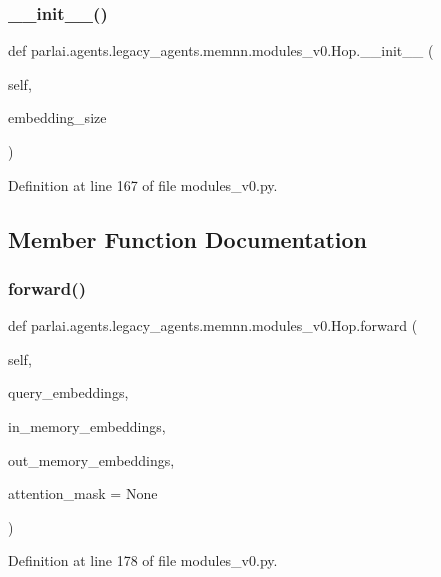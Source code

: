 \subsubsection{\texorpdfstring{\+\_\+\+\_\+init\+\_\+\+\_\+()}{\_\_init\_\_()}}
{\footnotesize\ttfamily def parlai.\+agents.\+legacy\+\_\+agents.\+memnn.\+modules\+\_\+v0.\+Hop.\+\_\+\+\_\+init\+\_\+\+\_\+ (\begin{DoxyParamCaption}\item[{}]{self,  }\item[{}]{embedding\+\_\+size }\end{DoxyParamCaption})}



Definition at line 167 of file modules\+\_\+v0.\+py.



\subsection{Member Function Documentation}
\mbox{\label{classparlai_1_1agents_1_1legacy__agents_1_1memnn_1_1modules__v0_1_1Hop_a19e28fabccb536fcc5f0db0e92a7a135}} 
\subsubsection{\texorpdfstring{forward()}{forward()}}
{\footnotesize\ttfamily def parlai.\+agents.\+legacy\+\_\+agents.\+memnn.\+modules\+\_\+v0.\+Hop.\+forward (\begin{DoxyParamCaption}\item[{}]{self,  }\item[{}]{query\+\_\+embeddings,  }\item[{}]{in\+\_\+memory\+\_\+embeddings,  }\item[{}]{out\+\_\+memory\+\_\+embeddings,  }\item[{}]{attention\+\_\+mask = {\ttfamily None} }\end{DoxyParamCaption})}



Definition at line 178 of file modules\+\_\+v0.\+py.



